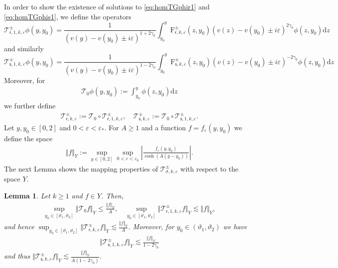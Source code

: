 \documentclass[11pt,reqno]{amsproc}
\newtheorem{lemma}[proposition]{Lemma}
\theoremstyle{definition}
\numberwithin{equation}{section}
\newcommand{\sr}{{\mathsf{r}}}
\newcommand{\s}{{\mathsf{s}}}
\newcommand{\cT}{{\mathcal T}}
\renewcommand{\d}{\mathrm{d}}
\newcommand{\ep}{\varepsilon}
\begin{document}
In order to show the existence of solutions to \eqref{eq:homTGphir1} and \eqref{eq:homTGphis1}, we define the operators
\begin{equation}\label{eq:defcTr1}
\cT_{\sr,1,k,\ep}^\pm \phi (y,y_0) = \frac{1}{(v(y) - v(y_0)\pm i\ep)^{1+2\gamma_0}} \int_{y_0}^y \mathrm{F}_{\sr,k,\ep}^\pm(z,y_0) (v(z) - v(y_0) \pm i\ep)^{2\gamma_0}\phi(z,y_0) \d z
\end{equation}
and similarly
\begin{equation}\label{eq:defcTs1}
\cT_{\s,1,k,\ep}^\pm \phi (y,y_0) = \frac{1}{(v(y) - v(y_0)\pm i\ep)^{1-2\gamma_0}} \int_{y_0}^y \mathrm{F}_{\s,k,\ep}^\pm(z,y_0) (v(z) - v(y_0) \pm i\ep)^{-2\gamma_0}\phi(z,y_0) \d z
\end{equation}
Moreover, for
\begin{align*}
\cT_{0}\phi(y,y_0) := \int_{y_0}^y \phi(z,y_0) \d z
\end{align*}
we further define
\begin{align*}
\cT_{\sr,k,\ep}^\pm := \cT_0 \circ \cT_{\sr,1,k,\ep}^\pm, \quad \cT_{\s,k,\ep}^\pm := \cT_0 \circ \cT_{\s,1,k,\ep}^\pm.
\end{align*}
Let $y,y_0\in[0,2]$  and $0<\ep<\ep_*$. For $A\geq 1$ and a function $f=f_\ep(y,y_0)$ we define the space
\begin{align*}
\Vert f \Vert_{Y} := \sup_{y\in[0,2]}\sup_{0<\ep<\ep_0} \left| \frac{f_\ep(y,y_0)}{\cosh(A(y-y_0))} \right|.
\end{align*}
The next Lemma shows the mapping properties of $\cT_{\sigma,k,\ep}^\pm$ with respect to the space $Y$.

\begin{lemma}\label{lemma:cTmapsYtoY}
Let $k\geq 1$ and $f\in Y$. Then,
\begin{align*}
 \sup_{y_0\in [\vartheta_1,\vartheta_2]}\Vert \cT_0 f \Vert_Y \leq \frac{\Vert f \Vert_Y}{A}, \quad \sup_{y_0\in [\vartheta_1,\vartheta_2]}\Vert \cT_{\sr,1,k,\ep}^\pm f \Vert_Y \lesssim \Vert f \Vert_Y,
\end{align*}
and hence $ \sup_{y_0\in [\vartheta_1,\vartheta_2]}\Vert \cT_{\sr,k,\ep}^\pm f \Vert_Y \lesssim \frac{\Vert f \Vert_Y}{A}$. Moreover, for $y_0\in(\vartheta_1,\vartheta_2)$ we have
\begin{align*}
\Vert \cT_{\s,1,k,\ep}^\pm f \Vert_Y \lesssim \frac{\Vert f \Vert_Y}{1-2\gamma_0}
\end{align*}
and thus $\Vert \cT_{\s,k,\ep}^\pm f \Vert_Y \lesssim \frac{\Vert f \Vert_Y}{A(1-2\gamma_0)}$.
\end{lemma}
\end{document}
